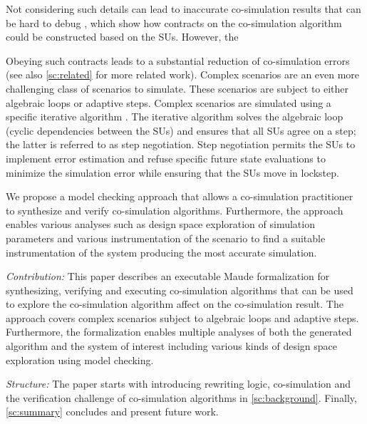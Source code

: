 Not considering such details can lead to inaccurate co-simulation results that can be hard to debug \cite{Gomes2019,Oakes2021}, which show how contracts on the co-simulation algorithm could be constructed based on the SUs. 
However, the 

Obeying such contracts leads to a substantial reduction of co-simulation errors (see also \cref{sc:related} for more related work). 
Complex scenarios are an even more challenging class of scenarios to simulate.
These scenarios are subject to either algebraic loops or adaptive steps. 
Complex scenarios are simulated using a specific iterative algorithm \cite{thrane2021}. 
The iterative algorithm solves the algebraic loop (cyclic dependencies between the SUs) and ensures that all SUs agree on a step; the latter is referred to as step negotiation. 
Step negotiation permits the SUs to implement error estimation and refuse specific future state evaluations to minimize the simulation error while ensuring that the SUs move in lockstep.


We propose a model checking approach that allows a co-simulation practitioner to synthesize and verify co-simulation algorithms.
Furthermore, the approach enables various analyses such as design space exploration of simulation parameters and various instrumentation of the scenario to find a suitable instrumentation of the system producing the most accurate simulation.


\textit{Contribution:}
This paper describes an executable Maude formalization for synthesizing, verifying and executing co-simulation algorithms that can be used to explore the co-simulation algorithm affect on the co-simulation result.
The approach covers complex scenarios subject to algebraic loops and adaptive steps.
Furthermore, the formalization enables multiple analyses of both the generated algorithm and the system of interest including various kinds of design space exploration using model checking. 

\textit{Structure:}
The paper starts with introducing rewriting logic, co-simulation and the verification challenge of co-simulation algorithms in \cref{sc:background}. 
Finally, \cref{sc:summary} concludes and present future work.